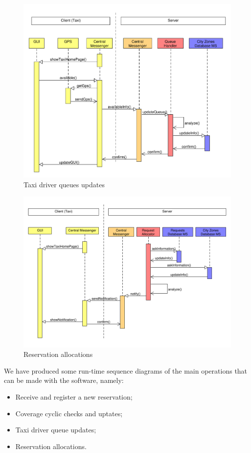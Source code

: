 \begin{figure}
\centering
\includegraphics[width=\textwidth]{tex-images/sequence-3}
\caption{Taxi driver queues updates}
\end{figure}

\begin{figure}
\centering
\includegraphics[width=\textwidth]{tex-images/sequence-4}
\caption{Reservation allocations}
\end{figure}

We have produced some run-time sequence diagrams of the main operations that can be made with the software, namely:
\begin{itemize}
\item Receive and register a new reservation;
\item Coverage cyclic checks and uptates;
\item Taxi driver queue updates;
\item Reservation allocations.
\end{itemize}

